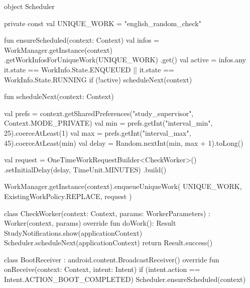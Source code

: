 object Scheduler {
    private const val UNIQUE_WORK = "english_random_check"

    fun ensureScheduled(context: Context) {
        val infos = WorkManager.getInstance(context)
            .getWorkInfosForUniqueWork(UNIQUE_WORK)
            .get()
        val active = infos.any {
            it.state == WorkInfo.State.ENQUEUED || it.state == WorkInfo.State.RUNNING
        }
        if (!active) scheduleNext(context)
    }

    fun scheduleNext(context: Context) {
        val prefs = context.getSharedPreferences("study_supervisor", Context.MODE_PRIVATE)
        val min = prefs.getInt("interval_min", 25).coerceAtLeast(1)
        val max = prefs.getInt("interval_max", 45).coerceAtLeast(min)
        val delay = Random.nextInt(min, max + 1).toLong()

        val request = OneTimeWorkRequestBuilder<CheckWorker>()
            .setInitialDelay(delay, TimeUnit.MINUTES)
            .build()

        WorkManager.getInstance(context).enqueueUniqueWork(
            UNIQUE_WORK,
            ExistingWorkPolicy.REPLACE,
            request
        )
    }
}

class CheckWorker(context: Context, params: WorkerParameters) : Worker(context, params) {
    override fun doWork(): Result {
        StudyNotifications.show(applicationContext)
        Scheduler.scheduleNext(applicationContext)
        return Result.success()
    }
}

class BootReceiver : android.content.BroadcastReceiver() {
    override fun onReceive(context: Context, intent: Intent) {
        if (intent.action == Intent.ACTION_BOOT_COMPLETED) {
            Scheduler.ensureScheduled(context)
        }
    }
}

